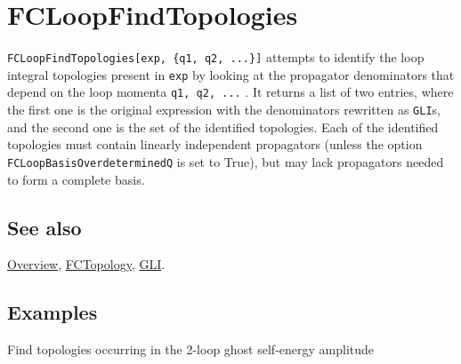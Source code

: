 \documentclass[../FeynCalcManual.tex]{subfiles}
\begin{document}
\hypertarget{fcloopfindtopologies}{%
\section{FCLoopFindTopologies}\label{fcloopfindtopologies}}

\texttt{FCLoopFindTopologies[\allowbreak{}exp,\ \allowbreak{}\{\allowbreak{}q1,\ \allowbreak{}q2,\ \allowbreak{}...\}]}
attempts to identify the loop integral topologies present in
\texttt{exp} by looking at the propagator denominators that depend on
the loop momenta \texttt{q1,\ \allowbreak{}q2,\ \allowbreak{}...} . It
returns a list of two entries, where the first one is the original
expression with the denominators rewritten as \texttt{GLI}s, and the
second one is the set of the identified topologies. Each of the
identified topologies must contain linearly independent propagators
(unless the option \texttt{FCLoopBasisOverdeterminedQ} is set to True),
but may lack propagators needed to form a complete basis.

\subsection{See also}

\hyperlink{toc}{Overview}, \hyperlink{fctopology}{FCTopology},
\hyperlink{gli}{GLI}.

\subsection{Examples}

Find topologies occurring in the 2-loop ghost self-energy amplitude

\begin{Shaded}
\begin{Highlighting}[]
\ExtensionTok{=} \OperatorTok{[}\OperatorTok{[\{}\OperatorTok{,} \OperatorTok{,} \OperatorTok{,} 
      \OperatorTok{,} \OperatorTok{\}]]}\NormalTok{;}
\end{Highlighting}
\end{Shaded}

\begin{Shaded}
\begin{Highlighting}[]
\ExtensionTok{=}\OperatorTok{[}\OperatorTok{,} \OperatorTok{\{}\OperatorTok{,}\OperatorTok{\}]}\NormalTok{;}
\end{Highlighting}
\end{Shaded}
\end{document}
